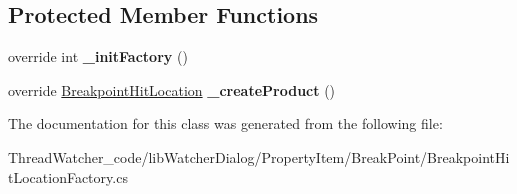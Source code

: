 \subsection*{Protected Member Functions}
\begin{DoxyCompactItemize}
\item 
\hypertarget{classlib_watcher_dialog_1_1_property_item_1_1_break_point_1_1_breakpoint_hit_location_factory_ab8ea075ec6cd2ba89e943dad08345124}{override int {\bfseries \+\_\+init\+Factory} ()}\label{classlib_watcher_dialog_1_1_property_item_1_1_break_point_1_1_breakpoint_hit_location_factory_ab8ea075ec6cd2ba89e943dad08345124}

\item 
\hypertarget{classlib_watcher_dialog_1_1_property_item_1_1_break_point_1_1_breakpoint_hit_location_factory_a6d309525d790976d28e5a2bb5f0564a0}{override \hyperlink{classlib_watcher_dialog_1_1_property_item_1_1_break_point_1_1_breakpoint_hit_location}{Breakpoint\+Hit\+Location} {\bfseries \+\_\+create\+Product} ()}\label{classlib_watcher_dialog_1_1_property_item_1_1_break_point_1_1_breakpoint_hit_location_factory_a6d309525d790976d28e5a2bb5f0564a0}

\end{DoxyCompactItemize}


The documentation for this class was generated from the following file\+:\begin{DoxyCompactItemize}
\item 
Thread\+Watcher\+\_\+code/lib\+Watcher\+Dialog/\+Property\+Item/\+Break\+Point/Breakpoint\+Hit\+Location\+Factory.\+cs\end{DoxyCompactItemize}
